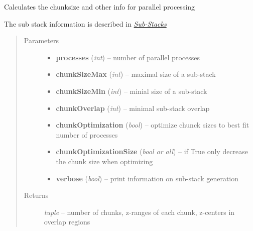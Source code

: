 \documentclass[letterpaper,10pt,english]{sphinxmanual}
\begin{document}
\begin{fulllineitems}
\label{api/ClearMap.ImageProcessing:ClearMap.ImageProcessing.StackProcessing.calculateChunkSize}
Calculates the chunksize and other info for parallel processing

The sub stack information is described in {\hyperref[api/ClearMap.ImageProcessing:substack]{\emph{Sub-Stacks}}}
\begin{quote}\begin{description}
\item[{Parameters}] \leavevmode\begin{itemize}
\item {} 
\textbf{processes} (\emph{int}) --
number of parallel processes

\item {} 
\textbf{chunkSizeMax} (\emph{int}) --
maximal size of a sub-stack

\item {} 
\textbf{chunkSizeMin} (\emph{int}) --
minial size of a sub-stack

\item {} 
\textbf{chunkOverlap} (\emph{int}) --
minimal sub-stack overlap

\item {} 
\textbf{chunkOptimization} (\emph{bool}) --
optimize chunck sizes to best fit number of processes

\item {} 
\textbf{chunkOptimizationSize} (\emph{bool or all}) --
if True only decrease the chunk size when optimizing

\item {} 
\textbf{verbose} (\emph{bool}) --
print information on sub-stack generation

\end{itemize}

\item[{Returns}] \leavevmode
\emph{tuple} --
number of chunks, z-ranges of each chunk, z-centers in overlap regions

\end{description}\end{quote}

\end{fulllineitems}
\end{document}
